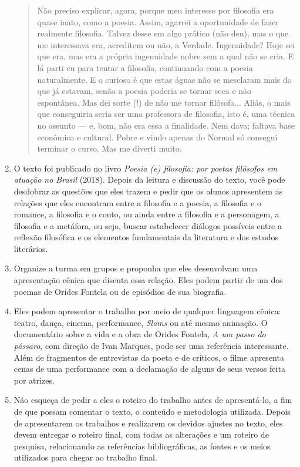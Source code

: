 \documentclass[12pt]{extarticle}
\begin{document}
\begin{enumerate}
\begin{quote}
Não preciso explicar, agora, porque meu interesse por filosofia era
quase inato, como a poesia. Assim, agarrei a oportunidade de fazer
realmente filosofia. Talvez desse em algo prático (não deu), mas o que
me interessava era, acreditem ou não, a Verdade. Ingenuidade? Hoje sei
que era, mas era a própria ingenuidade nobre sem a qual não se cria. E
lá parti eu para tentar a filosofia, continuando com a poesia
naturalmente. E o curioso é que estas águas não se mesclaram mais do que
já estavam, senão a poesia poderia se tornar seca e não espontânea. Mas
dei sorte (!) de não me tornar filósofa... Aliás, o mais que conseguiria
seria ser uma professora de filosofia, isto é, uma técnica no assunto
--- e, bom, não era essa a finalidade. Nem dava; faltava base econômica
e cultural. Pobre e vindo apenas do Normal só consegui terminar o curso.
Mas me diverti muito.
\end{quote}

\item O texto foi publicado no livro \emph{Poesia (e) filosofia: por poetas
filósofos em atuação no Brasil} (2018). Depois da leitura e discussão do
texto, você pode desdobrar as questões que eles trazem e pedir que os
alunos apresentem as relações que eles encontram entre a filosofia e a
poesia, a filosofia e o romance, a filosofia e o conto, ou ainda entre a
filosofia e a personagem, a filosofia e a metáfora, ou seja, buscar
estabelecer diálogos possíveis entre a reflexão filosófica e os
elementos fundamentais da literatura e dos estudos literários.

\item Organize a turma em grupos e proponha que eles desenvolvam uma
apresentação cênica que discuta essa relação. Eles podem partir de um
dos poemas de Orides Fontela ou de episódios de sua biografia.

\item Eles podem apresentar o trabalho por meio de qualquer linguagem
cênica: teatro, dança, cinema, performance, \emph{Slams} ou até mesmo
animação. O documentário sobre a vida e a obra de Orides Fontela,
\emph{A um passo do pássaro}, com direção de Ivan Marques, pode ser uma
referência interessante. Além de fragmentos de entrevistas da poeta e de
críticos, o filme apresenta cenas de uma performance com a declamação de
alguns de seus versos feita por atrizes.

\item Não esqueça de pedir a eles o roteiro do trabalho antes de
apresentá-lo, a fim de que possam comentar o texto, o conteúdo e
metodologia utilizada. Depois de apresentarem os trabalhos e realizarem
os devidos ajustes no texto, eles devem entregar o roteiro final, com
todas as alterações e um roteiro de pesquisa, relacionando as
referências bibliográficas, as fontes e os meios utilizados para chegar
ao trabalho final.
\end{enumerate}
\end{document}
